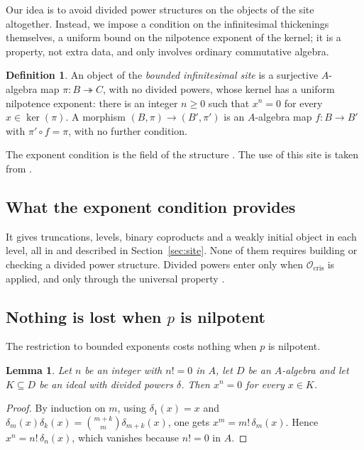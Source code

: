 \documentclass[11pt]{amsart}
\newcommand{\spa}{\medskip}
\newcommand{\Ocris}{\mathcal{O}_{\mathrm{cris}}}
\theoremstyle{plain}
\newtheorem{lemma}[theorem]{Lemma}
\theoremstyle{definition}
\newtheorem{definition}[theorem]{Definition}
\theoremstyle{remark}
\begin{document}
\spa

Our idea is to avoid divided power structures on the objects of the site altogether. Instead, we impose a condition on the infinitesimal thickenings themselves, a uniform bound on the nilpotence exponent of the kernel; it is a property, not extra data, and only involves ordinary commutative algebra.

\begin{definition}\label{def:thickening}
An object of the \emph{bounded infinitesimal site} is a surjective $A$-algebra map $\pi \colon B \twoheadrightarrow C$, with no divided powers, whose kernel has a uniform nilpotence exponent: there is an integer $n \ge 0$ such that $x^{n} = 0$ for every $x \in \ker(\pi)$.
A morphism $(B, \pi) \to (B', \pi')$ is an $A$-algebra map $f \colon B \to B'$ with $\pi' \circ f = \pi$, with no further condition.
\end{definition}

The exponent condition is the field  of the structure . The use of this site is taken from \cite{edged}.

\subsection{What the exponent condition provides}

It gives truncations, levels, binary coproducts and a weakly initial object in each level, all in  and described in Section~\ref{sec:site}. None of them requires building or checking a divided power structure. Divided powers enter only when $\Ocris$ is applied, and only through the universal property .

\subsection{Nothing is lost when \texorpdfstring{$p$}{p} is nilpotent}

The restriction to bounded exponents costs nothing when $p$ is nilpotent.

\begin{lemma}\label{lem:pd-exponent}
Let $n$ be an integer with $n! = 0$ in $A$, let $D$ be an $A$-algebra and let $K \subseteq D$ be an ideal with divided powers $\delta$. Then $x^{n} = 0$ for every $x \in K$.
\end{lemma}

\begin{proof}
By induction on $m$, using $\delta_1(x) = x$ and $\delta_m(x)\delta_k(x) = \binom{m+k}{m}\delta_{m+k}(x)$, one gets $x^m = m!\,\delta_m(x)$. Hence $x^{n} = n!\,\delta_{n}(x)$, which vanishes because $n! = 0$ in $A$.
\end{proof}
\end{document}
